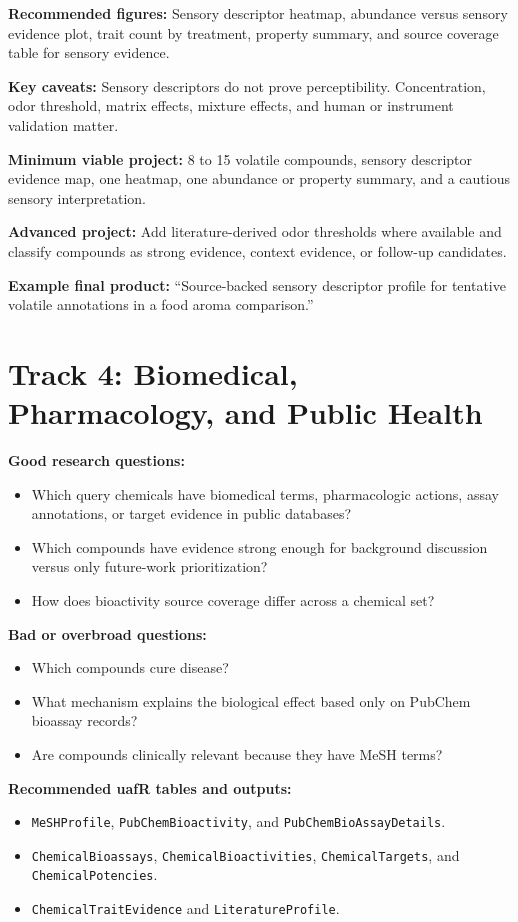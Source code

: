 \textbf{Recommended figures:} Sensory descriptor heatmap, abundance versus sensory evidence plot, trait count by treatment, property summary, and source coverage table for sensory evidence.

\textbf{Key caveats:} Sensory descriptors do not prove perceptibility. Concentration, odor threshold, matrix effects, mixture effects, and human or instrument validation matter.

\textbf{Minimum viable project:} 8 to 15 volatile compounds, sensory descriptor evidence map, one heatmap, one abundance or property summary, and a cautious sensory interpretation.

\textbf{Advanced project:} Add literature-derived odor thresholds where available and classify compounds as strong evidence, context evidence, or follow-up candidates.

\textbf{Example final product:} ``Source-backed sensory descriptor profile for tentative volatile annotations in a food aroma comparison.''

\section{Track 4: Biomedical, Pharmacology, and Public Health}
\textbf{Good research questions:}
\begin{itemize}
  \item Which query chemicals have biomedical terms, pharmacologic actions, assay annotations, or target evidence in public databases?
  \item Which compounds have evidence strong enough for background discussion versus only future-work prioritization?
  \item How does bioactivity source coverage differ across a chemical set?
\end{itemize}

\textbf{Bad or overbroad questions:}
\begin{itemize}
  \item Which compounds cure disease?
  \item What mechanism explains the biological effect based only on PubChem bioassay records?
  \item Are compounds clinically relevant because they have MeSH terms?
\end{itemize}

\textbf{Recommended uafR tables and outputs:}
\begin{itemize}
  \item \texttt{MeSHProfile}, \texttt{PubChemBioactivity}, and \texttt{PubChemBioAssayDetails}.
  \item \texttt{ChemicalBioassays}, \texttt{ChemicalBioactivities}, \texttt{ChemicalTargets}, and \texttt{ChemicalPotencies}.
  \item \texttt{ChemicalTraitEvidence} and \texttt{LiteratureProfile}.
\end{itemize}

